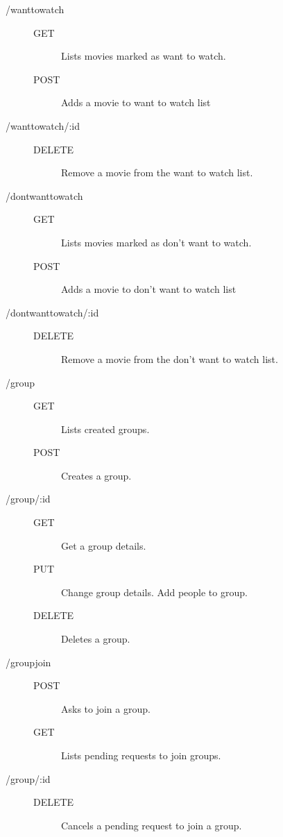 \begin{description}
  \item [/wanttowatch] \hfill
    \begin{description}
      \item [GET] Lists movies marked as want to watch.
      \item [POST] Adds a movie to want to watch list
    \end{description}
  \item [/wanttowatch/:id] \hfill
    \begin{description}
      \item [DELETE] Remove a movie from the want to watch list.
    \end{description}
  \item [/dontwanttowatch] \hfill
    \begin{description}
      \item [GET] Lists movies marked as don't want to watch.
      \item [POST] Adds a movie to don't want to watch list
    \end{description}
  \item [/dontwanttowatch/:id] \hfill
    \begin{description}
      \item [DELETE] Remove a movie from the don't want to watch list.
    \end{description}
  \item [/group] \hfill
    \begin{description}
      \item [GET] Lists created groups.
      \item [POST] Creates a group.
    \end{description}
  \item [/group/:id] \hfill
    \begin{description}
      \item [GET] Get a group details.
      \item [PUT] Change group details. Add people to group.
      \item [DELETE] Deletes a group.
    \end{description}
  \item [/groupjoin] \hfill
    \begin{description}
      \item [POST] Asks to join a group.
      \item [GET] Lists pending requests to join groups.
    \end{description}
  \item [/group/:id] \hfill
    \begin{description}
      \item [DELETE] Cancels a pending request to join a group.
    \end{description}
\end{description}

